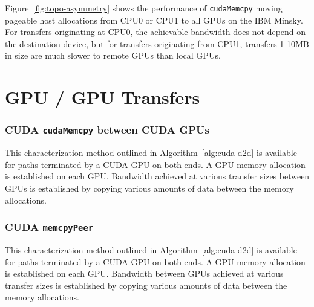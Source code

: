 Figure~\ref{fig:topo-asymmetry} shows the performance of \texttt{cudaMemcpy} moving pageable host allocations from CPU0 or CPU1 to all GPUs on the IBM Minsky.
For transfers originating at CPU0, the achievable bandwidth does not depend on the destination device, but for transfers originating from CPU1, transfers 1-10MB in size are much slower to remote GPUs than local GPUs.



\section{GPU / GPU Transfers}


\subsubsection{CUDA \texttt{cudaMemcpy} between CUDA GPUs}

This characterization method outlined in Algorithm~\ref{alg:cuda-d2d} is available for paths terminated by a CUDA GPU on both ends.
A GPU memory allocation is established on each GPU.
Bandwidth achieved at various transfer sizes between GPUs is established by copying various amounts of data between the memory allocations.


\subsubsection{CUDA \texttt{memcpyPeer}}

This characterization method outlined in Algorithm~\ref{alg:cuda-d2d} is available for paths terminated by a CUDA GPU on both ends.
A GPU memory allocation is established on each GPU.
Bandwidth between GPUs achieved at various transfer sizes is established by copying various amounts of data between the memory allocations.


